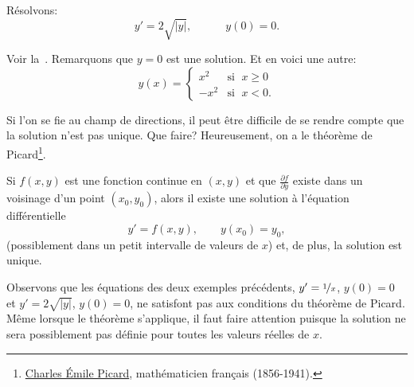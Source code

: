 \begin{example}
	Résolvons:
	\begin{equation*}
		y' = 2 \sqrt{\lvert y \rvert},\quad \qquad y(0) = 0 .
	\end{equation*}

	Voir la~.
	Remarquons que $y=0$ est une solution.  Et en voici une autre:
	\begin{equation*}
		y(x) =	\begin{cases}
				x^2 & \text{si } \; x \geq 0 \\
				-x^2 & \text{si } \; x < 0.
				\end{cases}
	\end{equation*}
\end{example}

Si l'on se fie au champ de directions, il peut être difficile de se rendre compte que la solution n'est pas unique.
Que faire?  Heureusement, on a le théorème de Picard$\!$\footnote{
\href{https://fr.wikipedia.org/wiki/Émile_Picard}{Charles \'Emile Picard},
mathématicien français
(1856-1941).}.

\begin{theorem}%
\label{slope:picardthm}%
Si $f(x , y)$ est une fonction continue en $(x , y)$ et que $\frac{\partial f}{\partial y}$
existe dans un voisinage d'un point $(x_0 , y_0)$, alors il existe une solution à l'équation différentielle
\begin{equation*}
	y' = f(x,y), \qquad y(x_0) = y_0,
\end{equation*}
(possiblement dans un petit intervalle de valeurs de $x$) et, de plus, la solution est unique.
\end{theorem}

Observons que les équations des deux exemples précédents, $y' = \nicefrac{1}{x}$, $y(0) = 0$ et
$y' = 2 \sqrt{\lvert y \rvert}$, $y(0) = 0$, ne satisfont pas aux conditions du théorème de Picard.
Même lorsque le théorème s'applique, il faut faire attention
puisque la solution ne sera possiblement pas définie pour toutes les valeurs réelles de $x$.


